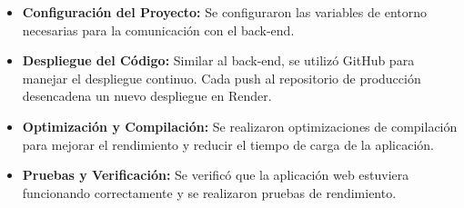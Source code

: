 \begin{itemize}
    \item \textbf{Configuración del Proyecto:} Se configuraron las variables de entorno necesarias para la comunicación con el back-end.
    \item \textbf{Despliegue del Código:} Similar al back-end, se utilizó GitHub para manejar el despliegue continuo. Cada push al repositorio de producción desencadena un nuevo despliegue en Render.
    \item \textbf{Optimización y Compilación:} Se realizaron optimizaciones de compilación para mejorar el rendimiento y reducir el tiempo de carga de la aplicación.
    \item \textbf{Pruebas y Verificación:} Se verificó que la aplicación web estuviera funcionando correctamente y se realizaron pruebas de rendimiento.
\end{itemize}